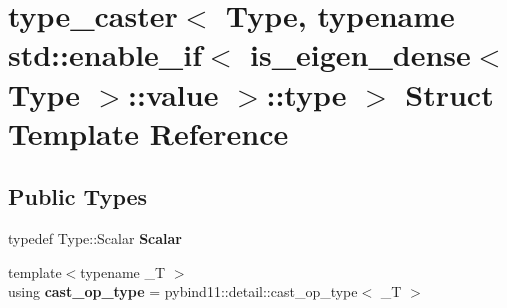 \hypertarget{structtype__caster_3_01_type_00_01typename_01std_1_1enable__if_3_01is__eigen__dense_3_01_type_01_4_1_1value_01_4_1_1type_01_4}{}\section{type\+\_\+caster$<$ Type, typename std\+:\+:enable\+\_\+if$<$ is\+\_\+eigen\+\_\+dense$<$ Type $>$\+:\+:value $>$\+:\+:type $>$ Struct Template Reference}
\label{structtype__caster_3_01_type_00_01typename_01std_1_1enable__if_3_01is__eigen__dense_3_01_type_01_4_1_1value_01_4_1_1type_01_4}
\subsection*{Public Types}
\begin{DoxyCompactItemize}
\item 
typedef Type\+::\+Scalar {\bfseries Scalar}\hypertarget{structtype__caster_3_01_type_00_01typename_01std_1_1enable__if_3_01is__eigen__dense_3_01_type_01_4_1_1value_01_4_1_1type_01_4_aaa04df5a1d1877ce2f68b58722757a35}{}\label{structtype__caster_3_01_type_00_01typename_01std_1_1enable__if_3_01is__eigen__dense_3_01_type_01_4_1_1value_01_4_1_1type_01_4_aaa04df5a1d1877ce2f68b58722757a35}

\item 
{\footnotesize template$<$typename \+\_\+T $>$ }\\using {\bfseries cast\+\_\+op\+\_\+type} = pybind11\+::detail\+::cast\+\_\+op\+\_\+type$<$ \+\_\+T $>$\hypertarget{structtype__caster_3_01_type_00_01typename_01std_1_1enable__if_3_01is__eigen__dense_3_01_type_01_4_1_1value_01_4_1_1type_01_4_ad31251a82a0731044bd753d2987cc5de}{}\label{structtype__caster_3_01_type_00_01typename_01std_1_1enable__if_3_01is__eigen__dense_3_01_type_01_4_1_1value_01_4_1_1type_01_4_ad31251a82a0731044bd753d2987cc5de}

\end{DoxyCompactItemize}

